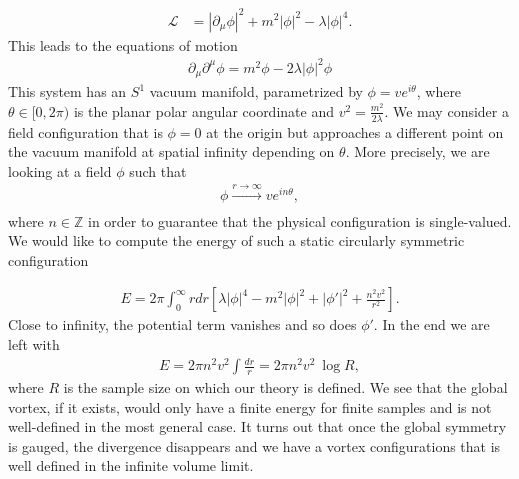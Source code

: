         \begin{align}
            \mathcal{L} &=  \left|\partial_{\mu} \phi \right|^2 + m^2 | \phi |^2 - \lambda |\phi|^4.
        \end{align}
    This leads to the equations of motion
    \begin{align}
        \partial_{\mu} \partial^{\mu} \phi = m^2 \phi - 2\lambda |\phi|^2 \phi
    \end{align}
    This system has an $S^1$ vacuum manifold, parametrized by $\phi = v e^{i \theta}$, where $\theta \in [0,2\pi)$ is the planar polar angular coordinate and $v^2 = \frac{m^2}{2 \lambda}$. We may consider a field configuration that is $\phi=0$ at the origin but approaches a different point on the vacuum manifold at spatial infinity depending on $\theta$. More precisely, we are looking at a field $\phi$ such that
    \begin{align}
        \phi \xrightarrow[]{r\rightarrow \infty} v e^{i n\theta},
    \end{align}
    where $n \in \mathbb{Z}$ in order to guarantee that the physical configuration is single-valued.
    We would like to compute the energy of such a static circularly symmetric configuration

    \begin{align}
        E= 2 \pi \int_0^{\infty} r dr \left[\lambda |\phi|^4 - m^2 |\phi|^2 + |\phi'|^2 + \frac{n^2 v^2}{r^2} \right].
    \end{align}
    Close to infinity, the potential term vanishes and so does $\phi'$. In the end we are left with
    \begin{align}
        E = 2\pi n^2 v^2 \int \frac{dr}{r} =  2\pi n^2 v^2  \ \log R,
    \end{align}
    where $R$ is the sample size on which our theory is defined. We see that the global vortex, if it exists, would only have a finite energy for finite samples and is not well-defined in the most general case. It turns out that once the global symmetry is gauged, the divergence disappears and we have a vortex configurations that is well defined in the infinite volume limit.

